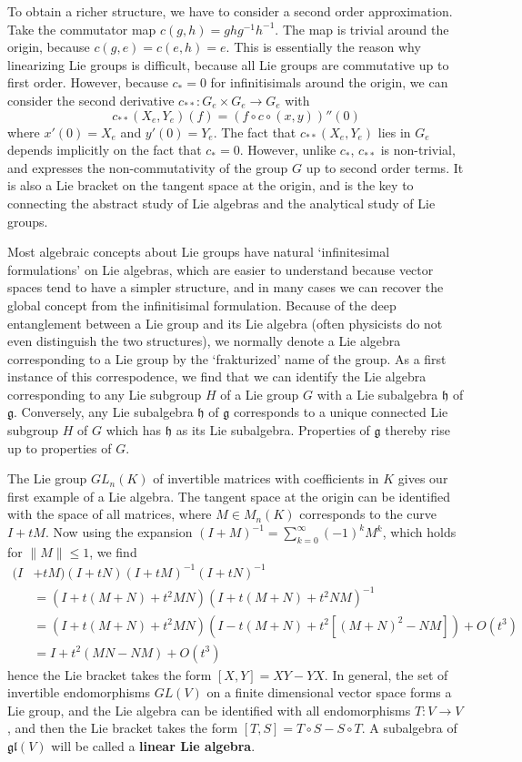 To obtain a richer structure, we have to consider a second order approximation. Take the commutator map $c(g,h) = ghg^{-1}h^{-1}$. The map is trivial around the origin, because $c(g,e) = c(e,h) = e$. This is essentially the reason why linearizing Lie groups is difficult, because all Lie groups are commutative up to first order. However, because $c_* = 0$ for infinitisimals around the origin, we can consider the second derivative $c_{**}: G_e \times G_e \to G_e$ with
%
\[ c_{**}(X_e,Y_e)(f) = (f \circ c \circ (x,y))''(0) \]
%
where $x'(0) = X_e$ and $y'(0) = Y_e$. The fact that $c_{**}(X_e, Y_e)$ lies in $G_e$ depends implicitly on the fact that $c_* = 0$. However, unlike $c_*$, $c_{**}$ is non-trivial, and expresses the non-commutativity of the group $G$ up to second order terms. It is also a Lie bracket on the tangent space at the origin, and is the key to connecting the abstract study of Lie algebras and the analytical study of Lie groups.

Most algebraic concepts about Lie groups have natural `infinitesimal formulations' on Lie algebras, which are easier to understand because vector spaces tend to have a simpler structure, and in many cases we can recover the global concept from the infinitisimal formulation. Because of the deep entanglement between a Lie group and its Lie algebra (often physicists do not even distinguish the two structures), we normally denote a Lie algebra corresponding to a Lie group by the `frakturized' name of the group. As a first instance of this correspodence, we find that we can identify the Lie algebra corresponding to any Lie subgroup $H$ of a Lie group $G$ with a Lie subalgebra $\mathfrak{h}$ of $\mathfrak{g}$. Conversely, any Lie subalgebra $\mathfrak{h}$ of $\mathfrak{g}$ corresponds to a unique connected Lie subgroup $H$ of $G$ which has $\mathfrak{h}$ as its Lie subalgebra. Properties of $\mathfrak{g}$ thereby rise up to properties of $G$.

\begin{example}
    The Lie group $GL_n(K)$ of invertible matrices with coefficients in $K$ gives our first example of a Lie algebra. The tangent space at the origin can be identified with the space of all matrices, where $M \in M_n(K)$ corresponds to the curve $I + tM$. Now using the expansion $(I + M)^{-1} = \sum_{k = 0}^\infty (-1)^k M^k$, which holds for $\| M \| \leq 1$, we find
    \begin{align*}
        (I& + tM)(I + tN)(I + tM)^{-1}(I + tN)^{-1}\\
        &= (I + t(M + N) + t^2MN)(I + t(M + N) + t^2NM)^{-1}\\
        &= (I + t(M + N) + t^2MN)(I - t(M + N) + t^2[(M + N)^2 - NM]) + O(t^3)\\
        &= I + t^2(MN - NM) + O(t^3)
    \end{align*}
    hence the Lie bracket takes the form $[X,Y] = XY - YX$. In general, the set of invertible endomorphisms $GL(V)$ on a finite dimensional vector space forms a Lie group, and the Lie algebra can be identified with all endomorphisms $T: V \to V$, and then the Lie bracket takes the form $[T,S] = T \circ S - S \circ T$. A subalgebra of $\mathfrak{gl}(V)$ will be called a {\bf linear Lie algebra}.
\end{example}

